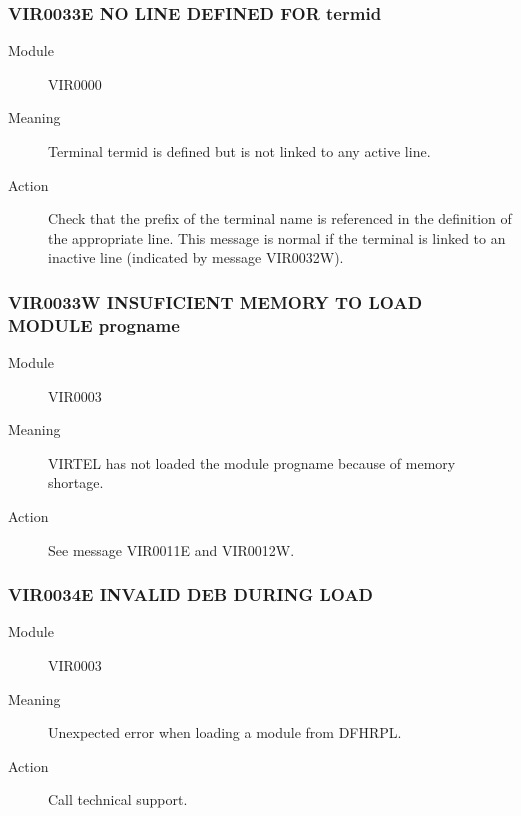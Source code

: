 \documentclass[letterpaper,10pt,english]{sphinxmanual}
\begin{document}
\subsubsection{VIR0033E NO LINE DEFINED FOR termid}
\label{\detokenize{messages:vir0033e-no-line-defined-for-termid}}\begin{description}
\item[{Module}] \leavevmode
VIR0000

\item[{Meaning}] \leavevmode
Terminal termid is defined but is not linked to any active line.

\item[{Action}] \leavevmode
Check that the prefix of the terminal name is referenced in the definition of the appropriate line. This message is normal if the terminal is linked to an inactive line (indicated by message VIR0032W).

\end{description}


\subsubsection{VIR0033W INSUFICIENT MEMORY TO LOAD MODULE progname}
\label{\detokenize{messages:vir0033w-insuficient-memory-to-load-module-progname}}\begin{description}
\item[{Module}] \leavevmode
VIR0003

\item[{Meaning}] \leavevmode
VIRTEL has not loaded the module progname because of memory shortage.

\item[{Action}] \leavevmode
See message VIR0011E and VIR0012W.

\end{description}


\subsubsection{VIR0034E INVALID DEB DURING LOAD}
\label{\detokenize{messages:vir0034e-invalid-deb-during-load}}\begin{description}
\item[{Module}] \leavevmode
VIR0003

\item[{Meaning}] \leavevmode
Unexpected error when loading a module from DFHRPL.

\item[{Action}] \leavevmode
Call technical support.

\end{description}
\end{document}
